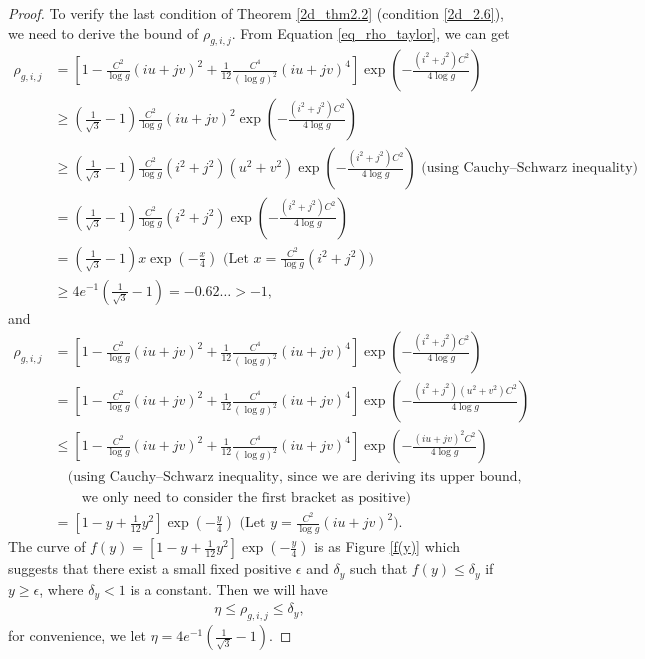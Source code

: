\documentclass{article}
\begin{document}
\begin{appendices}
\begin{proof}
		To verify the last condition of Theorem \ref{2d_thm2.2} (condition \ref{2d_2.6}), we need to derive the bound of $\rho_{g,i,j}$. From Equation \ref{eq_rho_taylor}, we can get
		\begin{equation*}
			\begin{aligned}
				\rho_{g,i,j}&=[1-\frac{C^2}{\log g}(iu+jv)^2+\frac{1}{12}\frac{C^4}{(\log g)^2}(iu+jv)^4]\exp(-\frac{(i^2+j^2)C^2}{4\log g})\\
				&\geq(\frac{1}{\sqrt{3}}-1)\frac{C^2}{\log g}(iu+jv)^2\exp(-\frac{(i^2+j^2)C^2}{4\log g})\\
				&\geq(\frac{1}{\sqrt{3}}-1)\frac{C^2}{\log g}(i^2+j^2)(u^2+v^2)\exp(-\frac{(i^2+j^2)C^2}{4\log g})\text{ (using Cauchy–Schwarz inequality)}\\
				&=(\frac{1}{\sqrt{3}}-1)\frac{C^2}{\log g}(i^2+j^2)\exp(-\frac{(i^2+j^2)C^2}{4\log g})\\
				&=(\frac{1}{\sqrt{3}}-1)x\exp(-\frac{x}{4})\text{ (Let }x=\frac{C^2}{\log g}(i^2+j^2))\\
				&\geq 4e^{-1}(\frac{1}{\sqrt{3}}-1)=-0.62\ldots>-1,
			\end{aligned} 
		\end{equation*}
		and
		\begin{equation*}
			\begin{aligned}
				\rho_{g,i,j}&=[1-\frac{C^2}{\log g}(iu+jv)^2+\frac{1}{12}\frac{C^4}{(\log g)^2}(iu+jv)^4]\exp(-\frac{(i^2+j^2)C^2}{4\log g})\\
				&=[1-\frac{C^2}{\log g}(iu+jv)^2+\frac{1}{12}\frac{C^4}{(\log g)^2}(iu+jv)^4]\exp(-\frac{(i^2+j^2)(u^2+v^2)C^2}{4\log g})\\
				&\leq[1-\frac{C^2}{\log g}(iu+jv)^2+\frac{1}{12}\frac{C^4}{(\log g)^2}(iu+jv)^4]\exp(-\frac{(iu+jv)^2C^2}{4\log g})\\
				&\quad\text{(using Cauchy–Schwarz inequality, since we are deriving its upper bound,}\\
				&\qquad\text{we only need to consider the first bracket as positive)}\\
				&=[1-y+\frac{1}{12}y^2]\exp(-\frac{y}{4})\text{ (Let }y=\frac{C^2}{\log g}(iu+jv)^2).
			\end{aligned} 
		\end{equation*}
		The curve of $f(y)=[1-y+\frac{1}{12}y^2]\exp(-\frac{y}{4})$ is as Figure \ref{f(y)} which suggests that there exist a small fixed positive $\epsilon$ and $\delta_y$ such that $f(y)\leq\delta_y$ if $y\geq\epsilon$, where $\delta_y<1$ is a constant. Then we will have
		\begin{equation}
			\label{eq_bound1}
			\begin{aligned}
				\eta\leq\rho_{g,i,j}\leq\delta_y,
			\end{aligned} 
		\end{equation}
		for convenience, we let $\eta=4e^{-1}(\frac{1}{\sqrt{3}}-1)$. 
		

\end{proof}
\end{appendices}
\end{document}
